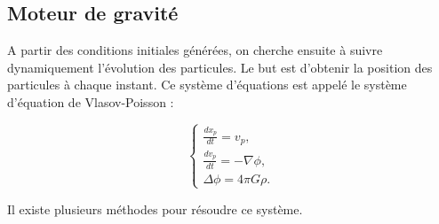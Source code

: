 


%
%

%
%

\subsection{Moteur de gravité}
\label{sec:gravity}


A partir des conditions initiales générées, on cherche ensuite à suivre dynamiquement l'évolution des particules.
Le but est d'obtenir la position des particules à chaque instant.
Ce système d'équations est appelé le système d'équation de Vlasov-Poisson :

\begin{equation}
\begin{cases}
\frac{d{x}_p}{dt} = { v}_p, \\
\frac{d{ v}_p}{dt} = -\nabla \phi , \\
\Delta \phi= 4\pi G \rho.
\end{cases}
\label{eq:Ncorps}
\end{equation}

Il existe plusieurs méthodes pour résoudre ce système.
